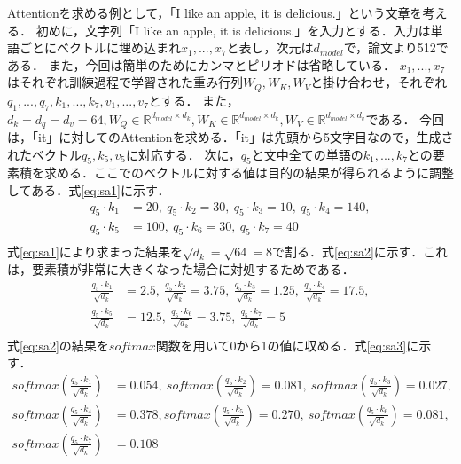 \documentclass[a4paper, oneside, openany, dvipdfmx]{suribt}%
\newcommand{\eref}[1]{式\eqref{#1}}
\begin{document}
Attentionを求める例として，「I like an apple, it is delicious.」という文章を考える．
初めに，文字列「I like an apple, it is delicious.」を入力とする．入力は単語ごとにベクトルに埋め込まれ$x_{1},...,x_{7}$と表し，次元は$d_{model}$で，論文\cite{vaswani2017attention}より512である．
また，今回は簡単のためにカンマとピリオドは省略している．
$x_{1},...,x_{7}$はそれぞれ訓練過程で学習された重み行列$W_{Q},W_{K},W_{V}$と掛け合わせ，それぞれ$q_{1},...,q_{7}, k_{1},...,k_{7}, v_{1},...,v_{7}$とする．
また，$d_{k}=d_{q}=d_{v}=64, W_{Q}\in \mathbb{R}^{d_{model}\times d_{k}}, W_{K}\in \mathbb{R}^{d_{model}\times d_{k}},  W_{V}\in \mathbb{R}^{d_{model}\times d_{v}}$である．
今回は，「it」に対してのAttentionを求める．「it」は先頭から5文字目なので，生成されたベクトル$q_{5}, k_{5}, v_{5}$に対応する．
次に，$q_{5}$と文中全ての単語の$k_{1},...,k_{7}$との要素積を求める．ここでのベクトルに対する値は目的の結果が得られるように調整してある．\eref{eq:sa1}に示す．
\begin{equation}
  \begin{split}
    q_{5}\cdot k_{1} &=20,\ q_{5}\cdot k_{2}=30,\ q_{5}\cdot k_{3}=10,\ q_{5}\cdot k_{4}=140,\\
    q_{5}\cdot k_{5} &=100,\ q_{5}\cdot k_{6}=30,\ q_{5}\cdot k_{7}=40\\
  \end{split}
  \label{eq:sa1}
\end{equation}
\eref{eq:sa1}により求まった結果を$\sqrt{d_{k}}=\sqrt{64}=8$で割る．\eref{eq:sa2}に示す．これは，要素積が非常に大きくなった場合に対処するためである．
\begin{equation}
  \begin{split}
    \frac{q_{5}\cdot k_{1}}{\sqrt{d_{k}}} &=2.5,\ \frac{q_{5}\cdot k_{2}}{\sqrt{d_{k}}}=3.75,\ \frac{q_{5}\cdot k_{3}}{\sqrt{d_{k}}}=1.25,\ \frac{q_{5}\cdot k_{4}}{\sqrt{d_{k}}}=17.5,\\
    \frac{q_{5}\cdot k_{5}}{\sqrt{d_{k}}} &=12.5,\ \frac{q_{5}\cdot k_{6}}{\sqrt{d_{k}}}=3.75,\ \frac{q_{5}\cdot k_{7}}{\sqrt{d_{k}}}=5\\
  \end{split}
  \label{eq:sa2}
\end{equation}
\eref{eq:sa2}の結果を$softmax$関数を用いて0から1の値に収める．\eref{eq:sa3}に示す．
\begin{equation}
  \begin{split}
    softmax(\frac{q_{5}\cdot k_{1}}{\sqrt{d_{k}}}) &=0.054,\ softmax(\frac{q_{5}\cdot k_{2}}{\sqrt{d_{k}}})=0.081,\ softmax(\frac{q_{5}\cdot k_{3}}{\sqrt{d_{k}}})=0.027,\\
    softmax(\frac{q_{5}\cdot k_{4}}{\sqrt{d_{k}}})&=0.378,softmax(\frac{q_{5}\cdot k_{5}}{\sqrt{d_{k}}}) =0.270,\ softmax(\frac{q_{5}\cdot k_{6}}{\sqrt{d_{k}}})=0.081,\\
    softmax(\frac{q_{5}\cdot k_{7}}{\sqrt{d_{k}}})&=0.108\\
  \end{split}
  \label{eq:sa3}
\end{equation}
\end{document}

